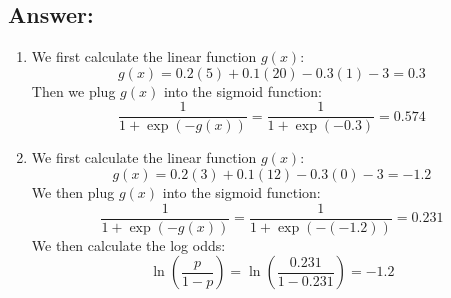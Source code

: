 \documentclass{article}
\begin{document}
\subsection*{Answer:}
\begin{enumerate} [label= (\alph*)]
    \item We first calculate the linear function $g(x)$:
    \begin{equation}
        g(x) = 0.2(5) + 0.1(20) - 0.3(1) - 3 = 0.3
    \end{equation}
    Then we plug $g(x)$ into the sigmoid function:
    \begin{equation}
        \frac{1}{1+\exp(-g(x))} = \frac{1}{1+\exp(-0.3)} = 0.574
    \end{equation}
    \item We first calculate the linear function $g(x)$:
    \begin{equation}
        g(x) = 0.2(3) + 0.1(12) - 0.3(0) - 3 = -1.2
    \end{equation}
    We then plug $g(x)$ into the sigmoid function:
    \begin{equation}
        \frac{1}{1+\exp(-g(x))} = \frac{1}{1+\exp(-(-1.2))} = 0.231
    \end{equation}
    We then calculate the log odds:
    \begin{equation}
        \ln(\frac{p}{1-p}) = \ln(\frac{0.231}{1-0.231}) = -1.2
    \end{equation}

\end{enumerate}
\end{document}
